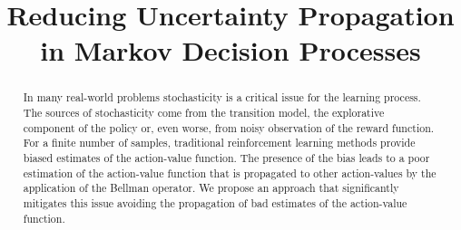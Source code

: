 \documentclass[conference]{IEEEtran}
\begin{document}
\title{Reducing Uncertainty Propagation in Markov Decision Processes}


\author{
}

\maketitle

\begin{abstract}
In many real-world problems stochasticity is a critical issue for the learning process. The sources of stochasticity come from the transition model, the explorative component of the policy or, even worse, from noisy observation of the reward function. For a finite number of samples, traditional reinforcement learning methods provide biased estimates of the action-value function. The presence of the bias leads to a poor estimation of the action-value function that is propagated to other action-values by the application of the Bellman operator. We propose an approach that significantly mitigates this issue avoiding the propagation of bad estimates of the action-value function.
\end{abstract}



%
\IEEEpeerreviewmaketitle
\end{document}
